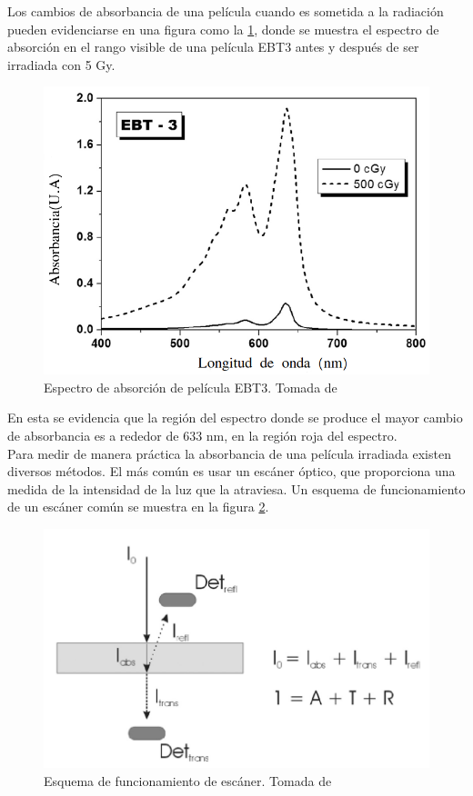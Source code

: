 Los cambios de absorbancia de una película cuando es sometida a la radiación pueden evidenciarse en una figura como la \ref{fig:AsorbanciaEBT3}, donde se muestra el espectro de absorción en el rango visible de una película EBT3 antes y después de ser irradiada con 5 Gy.\\
\begin{figure}[H]
	\centering
	\includegraphics[width=0.7\linewidth]{images/absorbancia.png}
	\caption{Espectro de absorción de película EBT3. Tomada de \cite{Devic2016}}
	\label{fig:AsorbanciaEBT3}
\end{figure}

En esta se evidencia que la región del espectro donde se produce el mayor cambio de absorbancia es a rededor de 633 nm, en la región roja del espectro.\\

Para medir de manera práctica la absorbancia de una película irradiada existen diversos métodos. El más común es usar un escáner óptico, que proporciona una medida de la intensidad de la luz que la atraviesa. Un esquema de funcionamiento de un escáner común se muestra en la figura \ref{fig:escaner}.\\ 
\begin{figure}[H]
	\centering
	\includegraphics[width=0.7\linewidth]{images/escaner.png}
	\caption{Esquema de funcionamiento de escáner. Tomada de \cite{Devic2016}}
	\label{fig:escaner}
\end{figure}

